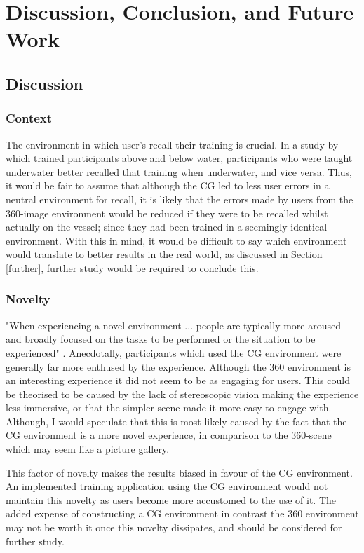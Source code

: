 \documentclass[ %
                    author={Elis Jones},
                supervisor={Dr. Kirsten Cater},
                    degree={BSc},
                     title={The Effect of Presentation Medium on Spatial Cognition},
                  subtitle={in the Virtual Environment},
                      year={2018} ]{dissertation}
\begin{document}
\chapter{Discussion, Conclusion, and Future Work}


\section{Discussion}\label{discussion}

\subsection{Context}\label{context}
The environment in which user's recall their training is crucial. In a study by \cite{Godden1975} which trained participants above and below water, participants who were taught underwater better recalled that training when underwater, and vice versa. Thus, it would be fair to assume that although the CG led to less user errors in a neutral environment for recall, it is likely that the errors made by users from the 360-image environment would be reduced if they were to be recalled whilst actually on the vessel; since they had been trained in a seemingly identical environment. With this in mind, it would be difficult to say which environment would translate to better results in the real world, as discussed in Section \ref{further}, further study would be required to conclude this. 

\subsection{Novelty}\label{novelty}
"When experiencing a novel environment ... people are typically more aroused and broadly focused on the tasks to be performed or the situation to be experienced" \citep{Witmer1998}. Anecdotally, participants which used the CG environment were generally far more enthused by the experience. Although the 360 environment is an interesting experience it did not seem to be as engaging for users. This could be theorised to be caused by the lack of stereoscopic vision making the experience less immersive, or that the simpler scene made it more easy to engage with. Although, I would speculate that this is most likely caused by the fact that the CG environment is a more novel experience, in comparison to the 360-scene which may seem like a picture gallery. 

This factor of novelty makes the results biased in favour of the CG environment. An implemented training application using the CG environment would not maintain this novelty as users become more accustomed to the use of it. The added expense of constructing a CG environment in contrast the 360 environment may not be worth it once this novelty dissipates, and should be considered for further study. 
\end{document}
